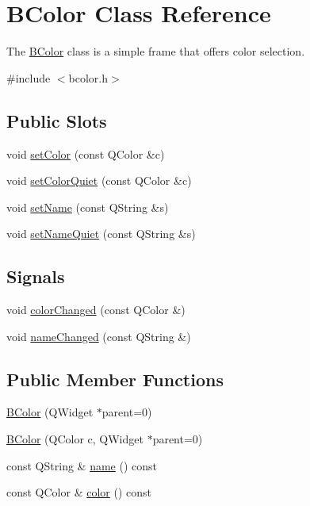 \hypertarget{class_b_color}{\section{\-B\-Color \-Class \-Reference}
\label{class_b_color}
}


\-The \hyperlink{class_b_color}{\-B\-Color} class is a simple frame that offers color selection.  




{\ttfamily \#include $<$bcolor.\-h$>$}

\subsection*{\-Public \-Slots}
\begin{DoxyCompactItemize}
\item 
void \hyperlink{class_b_color_a901e6704aef22f6db97d3578e14777c6}{set\-Color} (const \-Q\-Color \&c)
\item 
void \hyperlink{class_b_color_a3781c2b986f19ceaac7c994767015b56}{set\-Color\-Quiet} (const \-Q\-Color \&c)
\item 
void \hyperlink{class_b_color_abcf2d57696ada6466424663f15624cad}{set\-Name} (const \-Q\-String \&s)
\item 
void \hyperlink{class_b_color_ac159569b670ed175be068204a28a7be9}{set\-Name\-Quiet} (const \-Q\-String \&s)
\end{DoxyCompactItemize}
\subsection*{\-Signals}
\begin{DoxyCompactItemize}
\item 
void \hyperlink{class_b_color_a75ac94fde91e10eb6c27242f608b8d62}{color\-Changed} (const \-Q\-Color \&)
\item 
void \hyperlink{class_b_color_a5895b999f69044b919e6d5526577ad87}{name\-Changed} (const \-Q\-String \&)
\end{DoxyCompactItemize}
\subsection*{\-Public \-Member \-Functions}
\begin{DoxyCompactItemize}
\item 
\hyperlink{class_b_color_ac6b258d93f6b92fab2cce51d4a6a506f}{\-B\-Color} (\-Q\-Widget $\ast$parent=0)
\item 
\hyperlink{class_b_color_ae4773993aef804d6019d8216647555db}{\-B\-Color} (\-Q\-Color c, \-Q\-Widget $\ast$parent=0)
\item 
const \-Q\-String \& \hyperlink{class_b_color_aaf3fdfd487eaabb1f07268d87d355df3}{name} () const 
\item 
const \-Q\-Color \& \hyperlink{class_b_color_af6331a2f6914f3004b5630ad5e2e36ba}{color} () const 
\end{DoxyCompactItemize}
